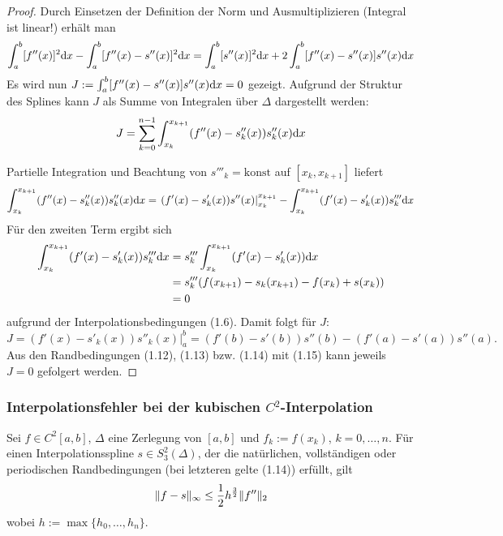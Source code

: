 \begin{proof}
 Durch Einsetzen der Definition der Norm und Ausmultiplizieren (Integral ist linear!) erhält man
 \[ \int_a^b [f''(x)]^2 \mathrm{d} x - \int_a^b [ f''(x) - s''(x) ]^2 \mathrm{d} x = \int_a^b [s''(x) ]^2 \mathrm{d} x
    +2 \int_a^b [ f''(x) - s''(x) ] s''(x) \mathrm{d} x \]
Es wird nun $J: = \int_a^b [ f''(x) - s''(x) ] s''(x) \mathrm{d} x = 0$ gezeigt. Aufgrund der Struktur des Splines kann $J$ als Summe von Integralen über $\Delta$ dargestellt werden:
\[ J = \sum_{k=0}^{n-1} \int_{x_k}^{x_{k+1}} (f''(x) -s''_k(x) ) s''_k(x) \mathrm{d} x \]
 
Partielle Integration und Beachtung von $s'''_k = \mathrm{konst}$ auf $[x_k, x_{k+1}]$ liefert
\[ \int_{x_k}^{x_{k+1}} ( f''(x) - s''_k(x) ) s''_k(x) \mathrm{d} x = 
      \left. (f'(x) - s'_k(x) ) s''(x) \right|_{x_k}^{x_{k+1}}
    - \int_{x_k}^{x_{k+1}} (f'(x) -s'_k(x) ) s'''_k \mathrm{d} x \]
Für den zweiten Term ergibt sich
\begin{align*}
 \int_{x_k}^{x_{k+1}} (f'(x) -s'_k(x) ) s'''_k \mathrm{d} x 
 &= s_k''' \int_{x_k}^{x_{k+1}} (f'(x) -s'_k(x) ) \mathrm{d} x \\
 &= s_k''' (f(x_{k+1}) - s_k(x_{k+1}) - f(x_k) + s(x_k)) \\
 &= 0
\end{align*}
aufgrund der Interpolationsbedingungen (1.6). Damit folgt für $J$:
\[ J = ( f'(x) - s'_k(x) ) s''_k(x) |_a^b 
     = (f'(b) - s'(b) ) s''(b) - (f'(a) - s'(a))s''(a). \]
Aus den Randbedingungen (1.12), (1.13) bzw. (1.14) mit (1.15) kann jeweils $J=0$ gefolgert werden.
\end{proof}

\subsubsection{Interpolationsfehler bei der kubischen \texorpdfstring{$C^2$}{C2}-Interpolation}
\begin{thm}
 Sei $f \in C^2[a,b]$, $\Delta$ eine Zerlegung von $[a,b]$ und $f_k := f(x_k)$, $k = 0, \ldots, n$. Für einen Interpolationsspline $s \in S_3^2(\Delta)$, der die natürlichen, vollständigen oder periodischen Randbedingungen (bei letzteren gelte (1.14)) erfüllt, gilt
 \[ \| f - s \|_\infty \le \frac{1}{2} h^{\frac{3}{2}} \| f'' \|_2 \]
 wobei $h := \max \{ h_0, \ldots, h_n \}$.
\end{thm}